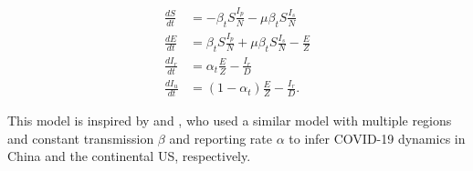 \documentclass[12pt]{extarticle}
\begin{document}
\begin{equation} \label{eq:model}
\begin{aligned}
\frac{dS}{dt} & = -\beta_t S \frac{I_p}{N} - \mu \beta_t S \frac{I_s}{N} \\
\frac{dE}{dt} & = \beta_t S \frac{I_p}{N} + \mu \beta_t S \frac{I_s}{N}  - \frac{E}{Z} \\
\frac{dI_r}{dt} & = \alpha_t \frac{E}{Z} - \frac{I_r}{D} \\
\frac{dI_u}{dt} & = (1-\alpha_t) \frac{E}{Z} - \frac{I_r}{D} .
\end{aligned}
\end{equation}

This model is inspired by \citet{Li2020} and \citet{Pei2020}, who used a similar model with multiple regions and constant transmission $\beta$ and reporting rate $\alpha$ to infer COVID-19 dynamics in China and the continental US, respectively.

\end{document}
